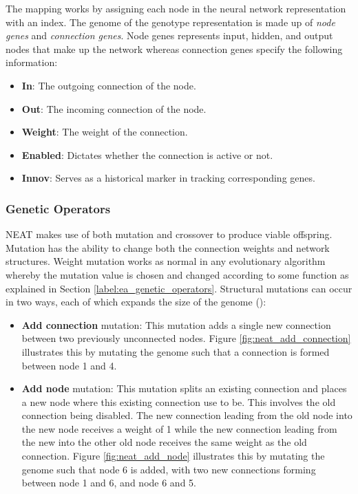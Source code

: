 \parbreak\noindent The mapping works by assigning each node in the neural network representation with an index. The genome of the genotype representation is made up of \textit{node genes} and \textit{connection genes}. Node genes represents input, hidden, and output nodes that make up the network whereas connection genes specify the following information:

\begin{itemize}
    \item \textbf{In}: The outgoing connection of the node.
    \item \textbf{Out}: The incoming connection of the node.
    \item \textbf{Weight}: The weight of the connection.
    \item \textbf{Enabled}: Dictates whether the connection is active or not.
    \item \textbf{Innov}: Serves as a historical marker in tracking corresponding genes.
\end{itemize}

\subsubsection{Genetic Operators}
\noindent NEAT makes use of both mutation and crossover to produce viable offspring. Mutation has the ability to change both the connection weights and network structures. Weight mutation works as normal in any evolutionary algorithm whereby the mutation value is chosen and changed according to some function as explained in Section \ref{label:ea_genetic_operators}. Structural mutations can occur in two ways, each of which expands the size of the genome (\cite{stanley2002evolving}):
\begin{itemize}
    \item \textbf{Add connection} mutation: This mutation adds a single new connection between two previously unconnected nodes. Figure \ref{fig:neat_add_connection} illustrates this by mutating the genome such that a connection is formed between node 1 and 4.
    \item \textbf{Add node} mutation: This mutation splits an existing connection and places a new node where this existing connection use to be. This involves the old connection being disabled. The new connection leading from the old node into the new node receives a weight of 1 while the new connection leading from the new into the other old node receives the same weight as the old connection. Figure \ref{fig:neat_add_node} illustrates this by mutating the genome such that node 6 is added, with two new connections forming between node 1 and 6, and node 6 and 5.
\end{itemize}

